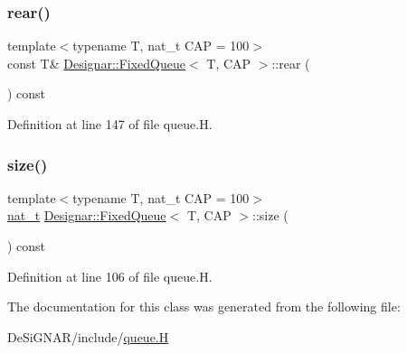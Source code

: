 \subsubsection{\texorpdfstring{rear()}{rear()}\hspace{0.1cm}{\footnotesize\ttfamily [2/2]}}
{\footnotesize\ttfamily template$<$typename T, nat\+\_\+t C\+AP = 100$>$ \\
const T\& \hyperlink{class_designar_1_1_fixed_queue}{Designar\+::\+Fixed\+Queue}$<$ T, C\+AP $>$\+::rear (\begin{DoxyParamCaption}{ }\end{DoxyParamCaption}) const\hspace{0.3cm}{\ttfamily [inline]}}



Definition at line 147 of file queue.\+H.

\mbox{\label{class_designar_1_1_fixed_queue_a9fa2f855edd54de0c847c8ba35c804cf}} 
\subsubsection{\texorpdfstring{size()}{size()}}
{\footnotesize\ttfamily template$<$typename T, nat\+\_\+t C\+AP = 100$>$ \\
\hyperlink{namespace_designar_aa72662848b9f4815e7bf31a7cf3e33d1}{nat\+\_\+t} \hyperlink{class_designar_1_1_fixed_queue}{Designar\+::\+Fixed\+Queue}$<$ T, C\+AP $>$\+::size (\begin{DoxyParamCaption}{ }\end{DoxyParamCaption}) const\hspace{0.3cm}{\ttfamily [inline]}}



Definition at line 106 of file queue.\+H.



The documentation for this class was generated from the following file\+:\begin{DoxyCompactItemize}
\item 
De\+Si\+G\+N\+A\+R/include/\hyperlink{queue_8_h}{queue.\+H}\end{DoxyCompactItemize}
